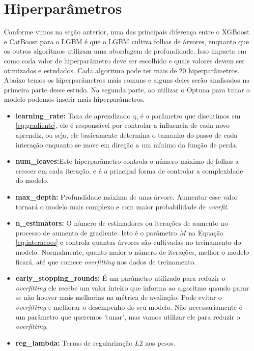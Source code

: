 \section{Hiperparâmetros} \label{cap3:hiper}
Conforme vimos na seção anterior, uma das principais diferença entre o XGBoost e CatBoost para o LGBM é que o LGBM cultiva folhas de árvores, enquanto que os outros algoritmos utilizam uma abordagem de profundidade. Isso impacta em como cada valor de hiperparâmetro deve ser escolhido e quais valores devem ser otimizados e estudados. Cada algoritmo pode ter mais de 20 hiperparâmetros. Abaixo temos os hiperparâmetros mais comuns e alguns deles serão analisados na primeira parte desse estudo. Na segunda parte, ao utilizar o Optuna para tunar o modelo podemos inserir mais hiperparâmetros.
\begin{itemize}
    \item \textbf{learning\_rate:} Taxa de aprendizado $\eta$, é o parâmetro que discutimos em \ref{eq:gradiente}, ele é responsável por controlar a influencia de cada novo aprendiz, ou seja, ele basicamente determina o tamanho do passo de cada interação enquanto se move em direção a um mínimo da função de perda.
    \item \textbf{num\_leaves:}Este hiperparâmetro controla o número máximo de folhas a crescer em cada iteração, e é a principal forma de controlar a complexidade do modelo.
    \item \textbf{max\_depth:} Profundidade máxima de uma árvore. Aumentar esse valor tornará o modelo mais complexo e com maior probabilidade de \textit{overfit}.
    \item \textbf{n\_estimators:} O número de estimadores ou iterações de aumento no processo de aumento de gradiente. Isto é o parâmetro $M$ na Equação \ref{eq:interacoes} e controla quantas árvores são cultivadas no treinamento do modelo. Normalmente, quanto maior o número de iterações, melhor o modelo ficará, até que comece \textit{overfitting} nos dados de treinamento.
    \item \textbf{early\_stopping\_rounds:} É um parâmetro utilizado para reduzir o \textit{overfitting} ele recebe um valor inteiro que informa ao algoritmo quando parar se não houver mais melhorias na métrica de avaliação. Pode evitar o \textit{overfitting} e melhorar o desempenho do seu modelo. Não necessariamente é um parâmetro que queremos 'tunar', mas vamos utilizar ele para reduzir o \textit{overfitting}.
    \item \textbf{reg\_lambda:} Termo de regularização $L2$ nos pesos.
\end{itemize}

